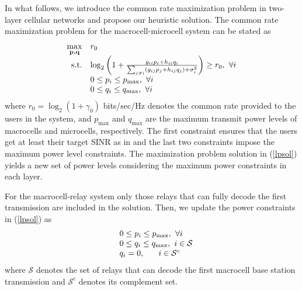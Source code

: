 \documentclass[conference,letterpaper,final,10pt]{IEEEtran}
\begin{document}
In what follows, we introduce the common rate maximization problem in two-layer cellular networks and propose our heuristic solution. The common rate maximization problem for the macrocell-microcell system can be stated as
\begin{align}\label{lpsol}\begin{array}{rl}  \max\limits_{\small{\textbf{p,q}}}  & r_0 \\
  \mathrm{s.t.} & \log_2 \small{\left(1 + \frac{g_{ii} p_i + h_{ii} q_i}{\sum_{j \neq i} \left( g_{ij} p_j + h_{ij} q_{j}   \right)+\sigma_i^2} \right)} \geq r_0, \hspace{.05in} \forall i \\
    & 0 \leq p_i \leq p_{\max}, \hspace{.05in} \forall i \\ & 0 \leq q_i \leq q_{\max}, \hspace{.05in} \forall i
\end{array}\end{align}
where $r_0 = \log_2(1+\gamma_0)$ bits/sec/Hz denotes the common rate provided to the users in the system, and $p_{\max}$ and $q_{\max}$ are the maximum transmit power levels of macrocells and microcells, respectively. The first constraint ensures that the users get at least their target SINR as in \cite{RamanConf,Geometric} and the last two constraints impose the maximum power level constraints. The maximization problem solution in (\ref{lpsol}) yields a new set of power levels considering the maximum power constraints in each layer.

For the macrocell-relay system only those relays that can fully decode the first transmission are included in the solution. Then, we update the power constraints in (\ref{lpsol}) as \begin{align}\label{lpsolrelay}
    \begin{array}{rl}
     & 0 \leq p_i \leq p_{\max}, \hspace{.05in} \forall i \\ & 0 \leq q_i \leq q_{\max}, \hspace{.05in} i \in \mathcal{S} \\ & q_i = 0,\hspace{.19in} \hspace{.05in} i \in \mathcal{S}^c
 \end{array}
\end{align}
where $\mathcal{S}$ denotes the set of relays that can decode the first macrocell base station transmission and $\mathcal{S}^c$ denotes its complement set.
\end{document}
